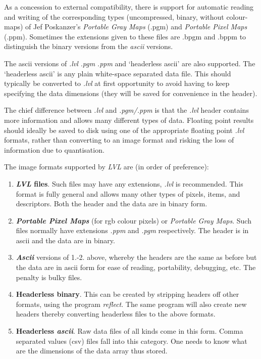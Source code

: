 \documentclass[11pt,twoside,english,a4paper]{article}
\begin{document}
As a concession to external compatibility, there is support for automatic reading
and writing of the corresponding types (uncompressed, binary, without
colour-maps) of Jef Poskanzer's \emph{Portable Gray Maps} (.pgm) and
\emph{Portable Pixel Maps} (.ppm). Sometimes the extensions given
to these files are .bpgm and .bppm to distinguish the binary versions 
from the \emph{ascii} versions. 

The ascii versions of \emph{.lvl} \emph{.pgm} \emph{.ppm} and `headerless ascii' are also supported.
The `headerless ascii' is any plain white-space separated data file. This should typically be converted to
\emph{.lvl} at first opportunity to avoid having to keep specifying the data dimensions 
(they will be saved for convenience in the header).

The chief difference between \emph{.lvl} and \emph{.pgm/.ppm}
is that the \emph{.lvl} header contains more information and allows
many different types of data. Floating point results should ideally be saved to disk using 
one of the appropriate floating point  \emph{.lvl} formats, rather than converting
to an image format and risking the loss of information due to quantisation.

The image formats supported by \emph{LVL} are (in order of preference):
\begin{enumerate}
\item \textbf{\emph{LVL} files}. Such files may have any extensions,
\emph{.lvl} is recommended. This format is fully general and allows many
other types of pixels, items, and descriptors. Both the header and the data are in  binary form.
\item\textbf{ \emph{Portable Pixel Maps}} (for rgb colour pixels) or \emph{Portable
Gray Maps}. Such files normally have extensions \textit{.ppm} and \textit{.pgm} respectively. 
The header is in ascii and the data are in binary.
\item \textbf{\emph{Ascii}} versions of 1.-2. above, whereby the headers are the same as before but the data
are in ascii form for ease of reading, portability, debugging, etc. The penalty is bulky files. 
\item \textbf{Headerless binary}. This can be created by stripping headers off other formats, using the program \emph{reflect}.
The same program will also create new headers thereby converting headerless files to the above formats.
\item \textbf{Headerless \emph{ascii}}. Raw data files of all kinds come in this form. 
Comma separated values (csv) files fall into this category. One needs to know what are the dimensions of the data array thus stored.
\end{enumerate}
\end{document}
